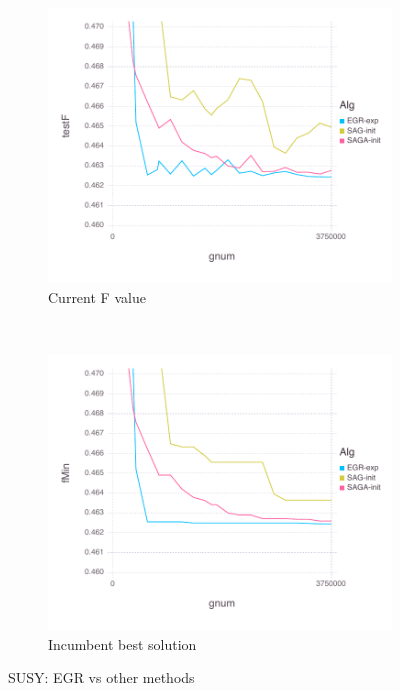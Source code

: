 \documentclass[11pt]{article}
\begin{document}
   \begin{figure}[H]
       \centering
       \begin{subfigure}[b]{0.45\textwidth}
           \includegraphics[width=\textwidth]{Figures/SUSYBLtrueFfFinal-g.pdf}
           \caption{Current F value}
       \end{subfigure}
       ~ %
         \begin{subfigure}[b]{0.45\textwidth}
             \includegraphics[width=\textwidth]{Figures/SUSYBLtrueFminfFinal-g.pdf}
             \caption{Incumbent best solution}
         \end{subfigure}
       \caption{SUSY: EGR vs other methods}\label{fig:SUSYom}
   \end{figure}
   
\end{document}
